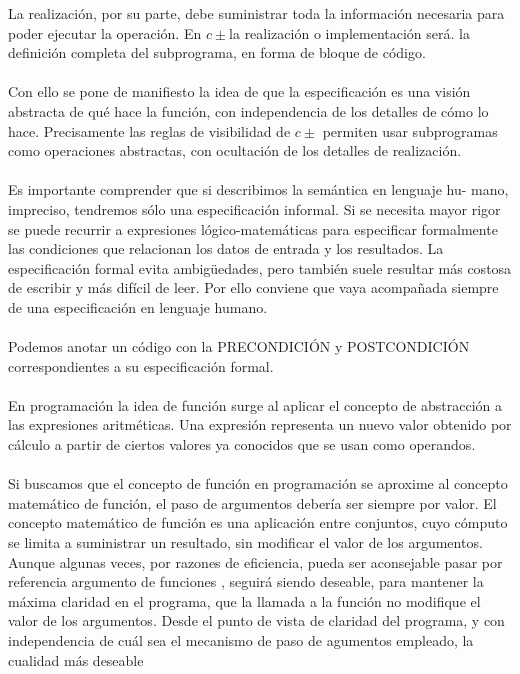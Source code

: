 \documentclass[11pt,a4paper]{article}
\begin{document}
  La realización, por su parte, debe suministrar toda la información necesaria
  para poder ejecutar la operación. En $ c\pm $la realización o implementación será.
  la definición completa del subprograma, en forma de bloque de código.\\
  \\
  Con ello se pone de manifiesto la idea de que la especificación es una visión
  abstracta de qué hace la función, con independencia de los detalles de cómo lo
  hace. Precisamente las reglas de visibilidad de $ c\pm $ permiten usar subprogramas
  como operaciones abstractas, con ocultación de los detalles de realización.\\
  \\
  Es importante comprender que si describimos la semántica en lenguaje hu-
  mano, impreciso, tendremos sólo una especificación informal. Si se necesita
  mayor rigor se puede recurrir a expresiones lógico-matemáticas para especificar formalmente las condiciones que relacionan los datos de entrada y los
  resultados. La especificación formal evita ambigüedades, pero también suele
  resultar más costosa de escribir y más difícil de leer. Por ello conviene que vaya
  acompañada siempre de una especificación en lenguaje humano. \\
  \\Podemos anotar un código con la PRECONDICIÓN y POSTCONDICIÓN correspondientes a su especificación formal.\\
  \\
  En programación la idea de función surge al aplicar el concepto de abstracción a
  las expresiones aritméticas. Una expresión representa un nuevo valor obtenido
  por cálculo a partir de ciertos valores ya conocidos que se usan como operandos.\\
  \\
  Si buscamos que el concepto de función en programación se aproxime al concepto matemático de función, el paso de argumentos debería ser
  siempre por valor. El concepto matemático de función es una aplicación entre
  conjuntos, cuyo cómputo se limita a suministrar un resultado, sin modificar el
  valor de los argumentos.
  Aunque algunas veces, por razones de eficiencia, pueda ser aconsejable pasar
  por referencia argumento de funciones , seguirá siendo deseable, para mantener la máxima claridad en el programa, que la llamada a la función no modifique el valor de los argumentos.
  Desde el punto de vista de claridad del programa, y con independencia de cuál
  sea el mecanismo de paso de agumentos empleado, la cualidad más deseable
\end{document}
